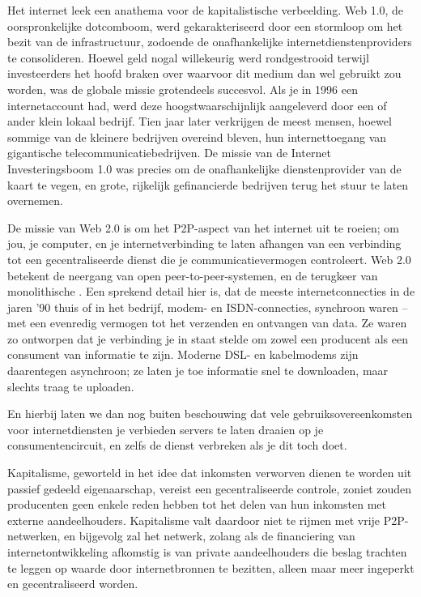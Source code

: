 {Het internet leek een anathema voor de kapitalistische verbeelding. Web
1.0, de oorspronkelijke dotcomboom, werd gekarakteriseerd door een
stormloop om het bezit van de infrastructuur, zodoende de
onafhankelijke internetdienstenproviders te consolideren. Hoewel geld
nogal willekeurig werd rondgestrooid terwijl investeerders het hoofd
braken over waarvoor dit medium dan wel gebruikt zou worden, was de
globale missie grotendeels succesvol. Als je in 1996 een
internetaccount had, werd deze hoogstwaarschijnlijk aangeleverd door
een of ander klein lokaal bedrijf. Tien jaar later verkrijgen de meest
mensen, hoewel sommige van de kleinere bedrijven overeind bleven, hun
internettoegang van gigantische telecommunicatiebedrijven. De missie
van de Internet Investeringsboom 1.0 was precies om de onafhankelijke
dienstenprovider van de kaart te vegen, en grote, rijkelijk
gefinancierde bedrijven terug het stuur te laten overnemen.

De missie van Web 2.0 is om het P2P{}-aspect van het internet uit te
roeien; om jou, je computer, en je internetverbinding te laten afhangen
van een verbinding tot een gecentraliseerde dienst die je
communicatievermogen controleert. Web 2.0 betekent de neergang van open
peer{}-to{}-peer{}-systemen, en de terugkeer van monolithische . Een sprekend detail hier is, dat de meeste
internetconnecties in de jaren '90 thuis of in het bedrijf, modem{}- en
ISDN{}-connecties, synchroon waren {--} met een evenredig vermogen tot
het verzenden en ontvangen van data. Ze waren zo ontworpen dat je
verbinding je in staat stelde om zowel een producent als een consument
van informatie te zijn. Moderne DSL{}- en kabelmodems zijn daarentegen
asynchroon; ze laten je toe informatie snel te downloaden, maar slechts
traag te uploaden. 

En hierbij laten we dan nog buiten beschouwing dat vele
gebruiksovereenkomsten voor internetdiensten je verbieden servers te
laten draaien op je consumentencircuit, en zelfs de dienst verbreken
als je dit toch doet. 

Kapitalisme, geworteld in het idee dat inkomsten verworven dienen te
worden uit passief gedeeld eigenaarschap, vereist een gecentraliseerde
controle, zoniet zouden producenten geen enkele reden hebben tot het
delen van hun inkomsten met externe aandeelhouders. Kapitalisme valt
daardoor niet te rijmen met vrije P2P{}-netwerken, en bijgevolg zal het
netwerk, zolang als de financiering van internetontwikkeling afkomstig
is van private aandeelhouders die beslag trachten te leggen op waarde
door internetbronnen te bezitten, alleen maar meer ingeperkt en
gecentraliseerd worden. 

}
